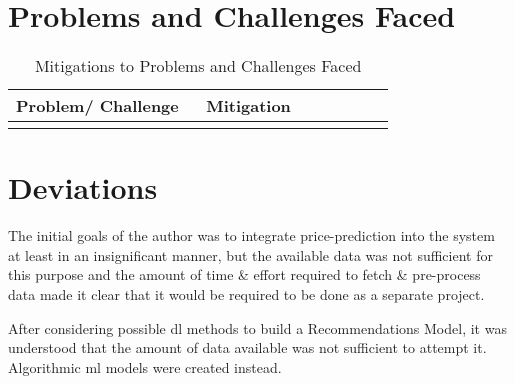 \section{Problems and Challenges Faced}

\vspace{-4mm}
\begin{longtable}{|p{0.473\linewidth}|p{0.473\linewidth}|}
\caption{Mitigations to Problems and Challenges Faced}\\ 
\hline
\textbf{Problem/ Challenge} & \textbf{Mitigation}\endfirsthead 
\hline
 &  \\
\hline
 & \\
\hline
\end{longtable}

\section{Deviations}
The initial goals of the author was to integrate price-prediction into the system at least in an insignificant manner, but the available data was not sufficient for this purpose and the amount of time \& effort required to fetch \& pre-process data made it clear that it would be required to be done as a separate project.

After considering possible \gls{dl} methods to build a Recommendations Model, it was understood that the amount of data available was not sufficient to attempt it. Algorithmic \gls{ml} models were created instead.

